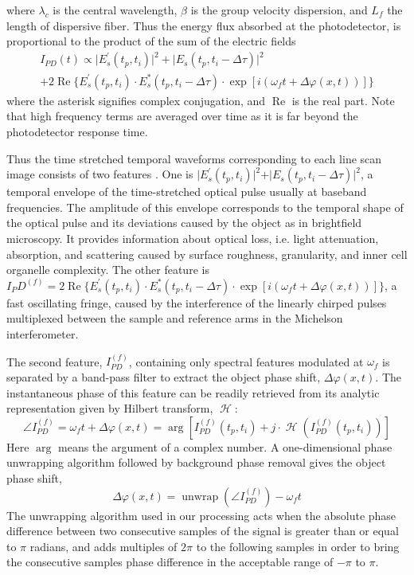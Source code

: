 \documentclass[aps,pra,preprint,superscriptaddress]{revtex4-1}
\DeclareMathOperator{\hilbert}{\mathcal{H}} %
\DeclareMathOperator{\unwrap}{unwrap} %
\begin{document}
where $\lambda_c$ is the central wavelength, $\beta$ is the group velocity dispersion, and $L_f$ the length of dispersive fiber. Thus the energy flux absorbed at the photodetector, is proportional to the product of the sum of the electric fields
\begin{multline}
I_{PD}(t) \propto \lvert E_s^\prime(t_p,t_i) \rvert^2 + \lvert E_s(t_p,t_i-\Delta\tau) \rvert^2\\
+ 2 \operatorname{Re}\lbrace E_s^\prime(t_p,t_i) \cdot E_s^*(t_p,t_i-\Delta\tau) \cdot \exp⁡[i(\omega_f t + \Delta\varphi(x,t))] \rbrace
\end{multline}
where the asterisk signifies complex conjugation, and $\operatorname{Re}$ is the real part. Note that high frequency terms are averaged over time as it is far beyond the photodetector response time. 

Thus the time stretched temporal waveforms corresponding to each line scan image consists of two features \cite{mahjoubfar2014label}. One is $\rvert E_s^\prime(t_p,t_i) \lvert^2 + \rvert E_s(t_p,t_i-\Delta\tau) \lvert^2$, a temporal envelope of the time-stretched optical pulse usually at baseband frequencies. The amplitude of this envelope corresponds to the temporal shape of the optical pulse and its deviations caused by the object as in brightfield microscopy. It provides information about optical loss, i.e. light attenuation, absorption, and scattering caused by surface roughness, granularity, and inner cell organelle complexity. The other feature is $I_PD^{(f)} = 2 \operatorname{Re}\lbrace E_s^\prime(t_p,t_i) \cdot E_s^*(t_p,t_i-\Delta\tau) \cdot \exp⁡[i(\omega_f t + \Delta\varphi(x,t))] \rbrace$, a fast oscillating fringe, caused by the interference of the linearly chirped pulses multiplexed between the sample and reference arms in the Michelson interferometer.

The second feature, $I_{PD}^{(f)}$, containing only spectral features modulated at $\omega_f$ is separated by a band-pass filter to extract the object phase shift, $\Delta\varphi(x,t)$. The instantaneous phase of this feature can be readily retrieved from its analytic representation given by Hilbert transform, $\hilbert$:
\begin{equation}
\angle I_{PD}^{(f)} = \omega_f t + \Delta\varphi(x,t) = \arg⁡[I_{PD}^{(f)} (t_p,t_i ) + j \cdot \hilbert(I_{PD}^{(f)}(t_p,t_i))]
\end{equation}
Here $\arg⁡$ means the argument of a complex number. A one-dimensional phase unwrapping algorithm followed by background phase removal gives the object phase shift, 
\begin{equation}
\Delta\varphi(x,t) = \unwrap(\angle I_{PD}^{(f)}) - \omega_f t
\end{equation}
The unwrapping algorithm used in our processing acts when the absolute phase difference between two consecutive samples of the signal is greater than or equal to $\pi$ radians, and adds multiples of $2\pi$ to the following samples in order to bring the consecutive samples phase difference in the acceptable range of $-\pi$ to $\pi$.
\end{document}
